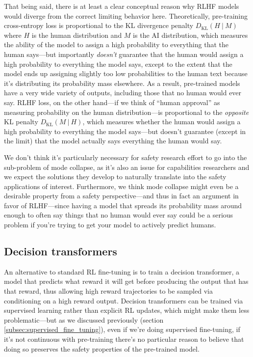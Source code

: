 \documentclass[
  onecolumn,
  nonatbib,
]{miri-tech-article}
\begin{document}
That being said, there is at least a clear conceptual reason why RLHF models would diverge from the correct limiting behavior here. Theoretically, pre-training cross-entropy loss is proportional to the KL divergence penalty $D_\text{KL}(H ~|~ M)$ where $H$ is the human distribution and $M$ is the AI distribution, which measures the ability of the model to assign a high probability to everything that the human says---but importantly \textit{doesn't} guarantee that the human would assign a high probability to everything the model says, except to the extent that the model ends up assigning slightly too low probabilities to the human text because it's distributing its probability mass elsewhere. As a result, pre-trained models have a very wide variety of outputs, including those that no human would ever say. RLHF loss, on the other hand---if we think of ``human approval'' as measuring probability on the human distribution---is proportional to the \textit{opposite} KL penalty $D_\text{KL}(M ~|~ H)$, which measures whether the human would assign a high probability to everything the model says---but doesn't guarantee (except in the limit) that the model actually says everything the human would say.

We don't think it's particularly necessary for safety research effort to go into the sub-problem of mode collapse, as it's also an issue for capabilities researchers and we expect the solutions they develop to naturally translate into the safety applications of interest. Furthermore, we think mode collapse might even be a desirable property from a safety perspective---and thus in fact an argument in favor of RLHF---since having a model that spreads its probability mass around enough to often say things that no human would ever say could be a serious problem if you're trying to get your model to actively predict humans.


\subsection{Decision transformers}

An alternative to standard RL fine-tuning is to train a decision transformer\cite{chen_decision_2021}, a model that predicts what reward it will get before producing the output that has that reward, thus allowing high reward trajectories to be sampled via conditioning on a high reward output. Decision transformers can be trained via supervised learning rather than explicit RL updates, which might make them less problematic---but as we discussed previously (section \ref{subsec:supervised_fine_tuning}), even if we're doing supervised fine-tuning, if it's not continuous with pre-training there's no particular reason to believe that doing so preserves the safety properties of the pre-trained model.
\end{document}
